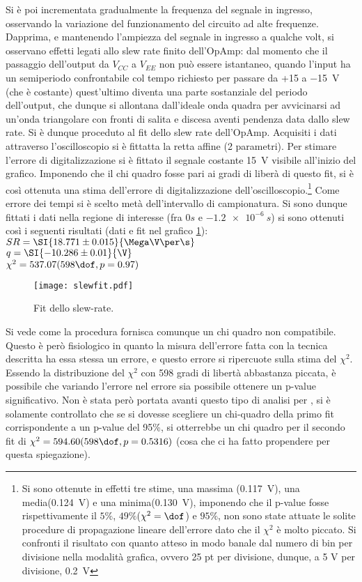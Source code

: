 Si è poi incrementata gradualmente la frequenza del segnale in ingresso, osservando la variazione del funzionamento del circuito ad alte frequenze.
Dapprima, e mantenendo l'ampiezza del segnale in ingresso a qualche volt, si osservano effetti legati allo slew rate finito dell'OpAmp: dal momento che il passaggio dell'output da $V_{CC}$ a $V_{EE}$ non può essere istantaneo, quando l'input ha un semiperiodo confrontabile col tempo richiesto per passare da +15 a \SI{-15}{\V} (che è costante) quest'ultimo diventa una parte sostanziale del periodo dell'output, che dunque si allontana dall'ideale onda quadra per avvicinarsi ad un'onda triangolare con fronti di salita e discesa aventi pendenza data dallo slew rate.
Si è dunque proceduto al fit dello slew rate dell'OpAmp. Acquisiti i dati attraverso l'oscilloscopio si è fittatta la retta affine (2 parametri). Per stimare l'errore di digitalizzazione si è fittato il segnale costante \SI{15}{\V} visibile all'inizio del grafico. Imponendo che il chi quadro fosse pari ai gradi di liberà di questo fit, si è così ottenuta una stima dell'errore di digitalizzazione dell'oscilloscopio.\footnote{Si sono ottenute in effetti tre stime, una massima (\SI{0.117}{V}), una media(\SI{0.124}{V}) e una minima(\SI{0.130}{V}), imponendo che il p-value fosse rispettivamente il $5\%$, $49\%$($\chi^2=\dof$) e $95\%$, non sono state attuate le solite procedure di propagazione lineare dell'errore dato che il $\chi^2$ è molto piccato. Si confronti il risultato con quanto atteso in modo banale dal numero di bin per divisione nella modalità grafica, ovvero 25 pt per divisione, dunque, a 5 V per divisione,  \SI{0.2}{V}} Come errore dei tempi si è scelto metà dell'intervallo di campionatura. Si sono dunque fittati i dati nella regione di interesse (fra $0 s$ e $\SI{-1.2e-6}{s}$) si sono ottenuti così i seguenti risultati	(dati e fit nel grafico \ref{f:SLW}):\\
$SR = \SI{18.771 \pm 0.015}{\Mega\V\per\s}$\\
$q = \SI{-10.286 \pm 0.01}{\V}$\\
$\chi^2 = 537.07 (598 \dof, p = 0.97)$\\

\begin{figure}[h]
	\centering
	\texttt{[image: slewfit.pdf]}
	\caption{Fit dello slew-rate.}
	\label{f:SLW}
\end{figure}
Si vede come la procedura fornisca comunque un chi quadro non compatibile. Questo è però fisiologico in quanto la misura dell'errore fatta con la tecnica descritta ha essa stessa un errore, e questo errore si ripercuote sulla stima del $\chi^2$. Essendo la distribuzione del $\chi^2$ con 598 gradi di libertà abbastanza piccata, è possibile che variando l'errore nel errore sia possibile ottenere un p-value significativo. Non è stata però portata avanti questo tipo di analisi per \sbatta, si è solamente controllato che se si dovesse scegliere un chi-quadro della primo fit corrispondente a un p-value del 95\%, si otterrebbe un chi quadro per il secondo fit di $\chi^2 = 594.60 (598 \dof, p = 0.5316)$ (cosa che ci ha fatto propendere per questa spiegazione). 



